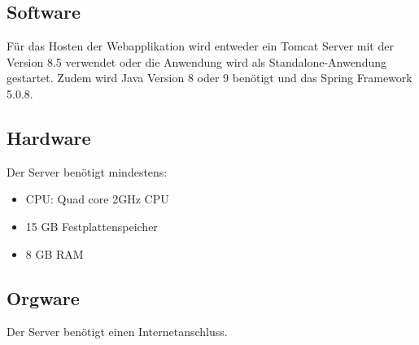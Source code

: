 \subsection{Software}
Für das Hosten der Webapplikation wird entweder ein Tomcat Server mit der Version 8.5 verwendet oder die Anwendung wird als Standalone-Anwendung gestartet.
Zudem wird Java Version 8 oder 9 benötigt und das Spring Framework 5.0.8.

\subsection{Hardware}
Der Server benötigt mindestens:
\begin{itemize}
\item CPU: Quad core 2GHz CPU
\item 15 GB Festplattenspeicher
\item 8 GB RAM
\end{itemize}

\subsection{Orgware}
Der Server benötigt einen Internetanschluss.
